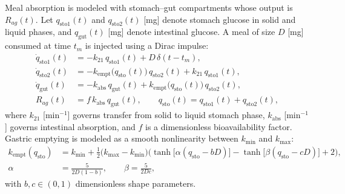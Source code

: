 \documentclass[preprint,12pt]{elsarticle}
\begin{document}
\begin{itemize}
Meal absorption is modeled with stomach--gut compartments whose output is $R_{ag}(t)$. Let $q_{\mathrm{sto}1}(t)$ and $q_{\mathrm{sto}2}(t)$ [mg] denote stomach glucose in solid and liquid phases, and $q_{\mathrm{gut}}(t)$ [mg] denote intestinal glucose. A meal of size $D$ [mg] consumed at time $t_m$ is injected using a Dirac impulse:
\begin{align}
\dot q_{\mathrm{sto}1}(t) &= -k_{21}\,q_{\mathrm{sto}1}(t) + D\,\delta(t-t_m), \label{eq:gut1}\\
\dot q_{\mathrm{sto}2}(t) &= -k_{\mathrm{empt}}\!\big(q_{\mathrm{sto}}(t)\big)\,q_{\mathrm{sto}2}(t) + k_{21}\,q_{\mathrm{sto}1}(t), \label{eq:gut2}\\
\dot q_{\mathrm{gut}}(t) &= -k_{\mathrm{abs}}\,q_{\mathrm{gut}}(t) + k_{\mathrm{empt}}\!\big(q_{\mathrm{sto}}(t)\big)\,q_{\mathrm{sto}2}(t), \label{eq:gut3}\\
R_{ag}(t) &= f\,k_{\mathrm{abs}}\,q_{\mathrm{gut}}(t), \qquad q_{\mathrm{sto}}(t)=q_{\mathrm{sto}1}(t)+q_{\mathrm{sto}2}(t), \label{eq:Ra}
\end{align}
where $k_{21}$ [min$^{-1}$] governs transfer from solid to liquid stomach phase, $k_{\mathrm{abs}}$ [min$^{-1}$] governs intestinal absorption, and $f$ is a dimensionless bioavailability factor. Gastric emptying is modeled as a smooth nonlinearity between $k_{\min}$ and $k_{\max}$:
\begin{align}
k_{\mathrm{empt}}(q_{\mathrm{sto}}) &=
k_{\min} + \tfrac12\big(k_{\max}-k_{\min}\big)\Big(
\tanh\!\big[\alpha(q_{\mathrm{sto}}-bD)\big]
-\tanh\!\big[\beta(q_{\mathrm{sto}}-cD)\big] + 2\Big), \label{eq:kempt}\\
\alpha &= \frac{5}{2D(1-b)}, \qquad
\beta  = \frac{5}{2Dc}, \label{eq:alpha_beta}
\end{align}
with $b,c\in(0,1)$ dimensionless shape parameters. 


\end{itemize}
\end{document}
